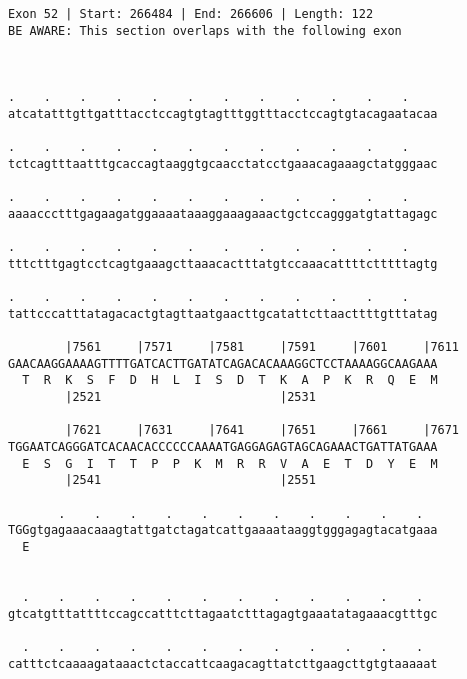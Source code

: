 \documentclass{article}
\begin{document}
\begin{Verbatim}
Exon 52 | Start: 266484 | End: 266606 | Length: 122
BE AWARE: This section overlaps with the following exon



.    .    .    .    .    .    .    .    .    .    .    .    
atcatatttgttgatttacctccagtgtagtttggtttacctccagtgtacagaatacaa
                                                            
.    .    .    .    .    .    .    .    .    .    .    .    
tctcagtttaatttgcaccagtaaggtgcaacctatcctgaaacagaaagctatgggaac
                                                            
.    .    .    .    .    .    .    .    .    .    .    .    
aaaaccctttgagaagatggaaaataaaggaaagaaactgctccagggatgtattagagc
                                                            
.    .    .    .    .    .    .    .    .    .    .    .    
tttctttgagtcctcagtgaaagcttaaacactttatgtccaaacattttctttttagtg
                                                            
.    .    .    .    .    .    .    .    .    .    .    .    
tattcccatttatagacactgtagttaatgaacttgcatattcttaacttttgtttatag
                                                            
        |7561     |7571     |7581     |7591     |7601     |7611
GAACAAGGAAAAGTTTTGATCACTTGATATCAGACACAAAGGCTCCTAAAAGGCAAGAAA
  T  R  K  S  F  D  H  L  I  S  D  T  K  A  P  K  R  Q  E  M
        |2521                         |2531                 
  
        |7621     |7631     |7641     |7651     |7661     |7671
TGGAATCAGGGATCACAACACCCCCCAAAATGAGGAGAGTAGCAGAAACTGATTATGAAA
  E  S  G  I  T  T  P  P  K  M  R  R  V  A  E  T  D  Y  E  M
        |2541                         |2551                 
  
       .    .    .    .    .    .    .    .    .    .    .  
TGGgtgagaaacaaagtattgatctagatcattgaaaataaggtgggagagtacatgaaa
  E                                                         
                                                            
  
  .    .    .    .    .    .    .    .    .    .    .    .  
gtcatgtttattttccagccatttcttagaatctttagagtgaaatatagaaacgtttgc
                                                            
  .    .    .    .    .    .    .    .    .    .    .    .  
catttctcaaaagataaactctaccattcaagacagttatcttgaagcttgtgtaaaaat
                                                            

\end{Verbatim}
\end{document}
